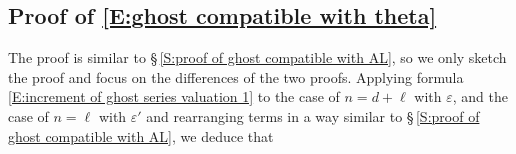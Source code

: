 \documentclass[12pt]{amsart}
\theoremstyle{definition}
\numberwithin{equation}{subsection}
\newcommand{\midd}{\mathrm{mid}}
\begin{document}
\subsection{Proof of \eqref{E:ghost compatible with theta}}
\label{S:proof of ghost compatible with theta}
The proof is similar to \S\,\ref{S:proof of ghost compatible with AL}, so we only sketch the proof and focus on the differences of the two proofs.
Applying formula \eqref{E:increment of ghost series valuation 1} to the case of $n=d+\ell$ with $\varepsilon$, and the case of $n=\ell$ with $\varepsilon'$ and rearranging terms in a way similar to \S\,\ref{S:proof of ghost compatible with AL}, we deduce that
\end{document}
